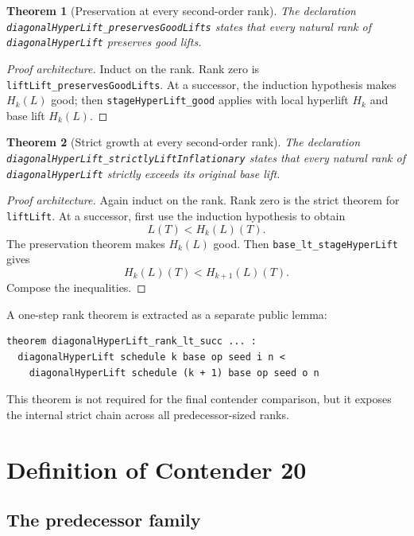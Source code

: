 \documentclass[11pt]{article}
\newtheorem{theorem}{Theorem}[section]
\theoremstyle{definition}
\theoremstyle{remark}
\newcommand{\lean}[1]{\nolinkurl{#1}}
\begin{document}
\begin{theorem}[Preservation at every second-order rank]
The declaration \lean{diagonalHyperLift_preservesGoodLifts} states that every
natural rank of \lean{diagonalHyperLift} preserves good lifts.
\end{theorem}

\begin{proof}[Proof architecture]
Induct on the rank. Rank zero is
\lean{liftLift_preservesGoodLifts}. At a successor, the induction hypothesis
makes $H_k(L)$ good; then \lean{stageHyperLift_good} applies with local
hyperlift $H_k$ and base lift $H_k(L)$.
\end{proof}

\begin{theorem}[Strict growth at every second-order rank]
The declaration \lean{diagonalHyperLift_strictlyLiftInflationary} states that
every natural rank of \lean{diagonalHyperLift} strictly exceeds its original
base lift.
\end{theorem}

\begin{proof}[Proof architecture]
Again induct on the rank. Rank zero is the strict theorem for \lean{liftLift}.
At a successor, first use the induction hypothesis to obtain
\[
  L(T)<H_k(L)(T).
\]
The preservation theorem makes $H_k(L)$ good. Then
\lean{base_lt_stageHyperLift} gives
\[
  H_k(L)(T)<H_{k+1}(L)(T).
\]
Compose the inequalities.
\end{proof}

A one-step rank theorem is extracted as a separate public lemma:

\begin{lstlisting}
theorem diagonalHyperLift_rank_lt_succ ... :
  diagonalHyperLift schedule k base op seed i n <
    diagonalHyperLift schedule (k + 1) base op seed o n
\end{lstlisting}

This theorem is not required for the final contender comparison, but it exposes
the internal strict chain across all predecessor-sized ranks.

\section{Definition of Contender 20}

\subsection{The predecessor family}
\end{document}
